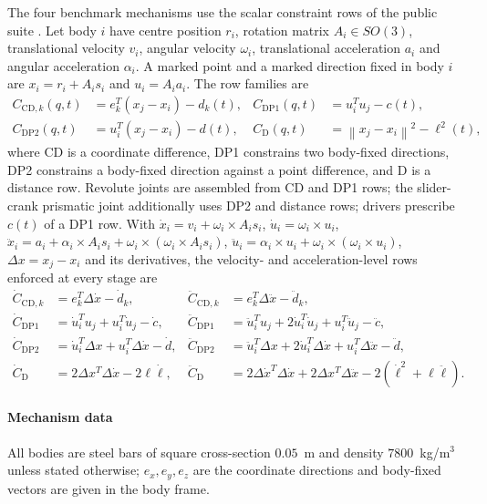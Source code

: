 \documentclass[preprint,12pt]{elsarticle}
\begin{document}
The four benchmark mechanisms use the scalar constraint rows of the public suite
\cite{kissel2022absolute}. Let body $i$ have centre position $r_i$, rotation matrix $A_i\in SO(3)$,
translational velocity $v_i$, angular velocity $\omega_i$, translational acceleration $a_i$ and
angular acceleration $\alpha_i$. A marked point and a marked direction fixed in body $i$ are
$x_i=r_i+A_i s_i$ and $u_i=A_i a_i$. The row families are
\begin{align}
  C_{\mathrm{CD},k}(q,t) &= e_k^T\left(x_j-x_i\right)-d_k(t), &
  C_{\mathrm{DP1}}(q,t) &= u_i^T u_j-c(t),\\
  C_{\mathrm{DP2}}(q,t) &= u_i^T\left(x_j-x_i\right)-d(t), &
  C_{\mathrm{D}}(q,t) &= \left\|x_j-x_i\right\|^2-\ell^2(t),
  \label{eq:lower-pair-row-families}
\end{align}
where CD is a coordinate difference, DP1 constrains two body-fixed directions, DP2 constrains a
body-fixed direction against a point difference, and D is a distance row. Revolute joints are
assembled from CD and DP1 rows; the slider-crank prismatic joint additionally uses DP2 and distance
rows; drivers prescribe $c(t)$ of a DP1 row. With
$\dot x_i = v_i+\omega_i\times A_i s_i$, $\dot u_i = \omega_i\times u_i$,
$\ddot x_i = a_i+\alpha_i\times A_i s_i+\omega_i\times(\omega_i\times A_i s_i)$,
$\ddot u_i = \alpha_i\times u_i+\omega_i\times(\omega_i\times u_i)$, $\Delta x=x_j-x_i$ and
its derivatives, the velocity- and acceleration-level rows enforced at every stage are
\begin{align}
  \dot C_{\mathrm{CD},k} &= e_k^T\Delta\dot x-\dot d_k, &
  \ddot C_{\mathrm{CD},k} &= e_k^T\Delta\ddot x-\ddot d_k,\\
  \dot C_{\mathrm{DP1}} &= \dot u_i^T u_j+u_i^T\dot u_j-\dot c, &
  \ddot C_{\mathrm{DP1}} &= \ddot u_i^T u_j+2\dot u_i^T\dot u_j+u_i^T\ddot u_j-\ddot c,\\
  \dot C_{\mathrm{DP2}} &= \dot u_i^T\Delta x+u_i^T\Delta\dot x-\dot d, &
  \ddot C_{\mathrm{DP2}} &= \ddot u_i^T\Delta x+2\dot u_i^T\Delta\dot x+u_i^T\Delta\ddot x-\ddot d,\\
  \dot C_{\mathrm{D}} &= 2\Delta x^T\Delta\dot x-2\ell\dot\ell, &
  \ddot C_{\mathrm{D}} &= 2\Delta\dot x^T\Delta\dot x+2\Delta x^T\Delta\ddot x-2(\dot\ell^2+\ell\ddot\ell).
  \label{eq:lower-pair-acceleration-rows}
\end{align}

\paragraph{Mechanism data}
All bodies are steel bars of square cross-section $0.05$~m and density $7800$~kg/m$^3$ unless
stated otherwise; $e_x,e_y,e_z$ are the coordinate directions and body-fixed vectors are given in
the body frame.
\end{document}
